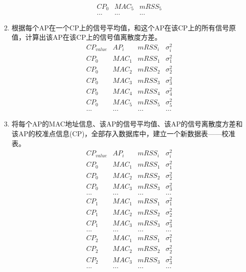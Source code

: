 \documentclass[UTF8, twocolumn ]{ctexart}
\begin{document}
\begin{enumerate}
\begin{displaymath}
\begin{array}{c|c|c}
      CP_{0} & MAC_{5} & mRSS_{5} \\
      ... & ... & ...
    \end{array}
  \end{displaymath}
\item 根据每个AP在一个CP上的信号平均值，和这个AP在该CP上的所有信号原值，计算出该AP在该CP上的信号值离散度方差。
  \begin{displaymath}
    \begin{array}{c|c|c|c}
      CP_{value} & AP_{i} & mRSS_{i} & \sigma^{2}_{i} \\ \hline
      CP_{0} & MAC_{1} & mRSS_{1} & \sigma^{2}_{1} \\
      CP_{0} & MAC_{2} & mRSS_{2} & \sigma^{2}_{2} \\
      CP_{0} & MAC_{3} & mRSS_{3} & \sigma^{2}_{3} \\
      CP_{0} & MAC_{4} & mRSS_{4} & \sigma^{2}_{4} \\
      CP_{0} & MAC_{5} & mRSS_{5} & \sigma^{2}_{5} \\
      ... & ... & ... & ...
    \end{array}
  \end{displaymath}
\item 将每个AP的MAC地址信息、该AP的信号平均值、该AP的信号离散度方差和该AP的校准点信息(CP)，全部存入数据库中，建立一个新数据表——校准表。
  \begin{displaymath}
    \begin{array}{c|c|c|c}
      CP_{value} & AP_{i} & mRSS_{i} & \sigma^{2}_{i} \\ \hline
      CP_{0} & MAC_{1} & mRSS_{1} & \sigma^{2}_{1} \\
      CP_{0} & MAC_{2} & mRSS_{2} & \sigma^{2}_{2} \\
      CP_{0} & MAC_{3} & mRSS_{3} & \sigma^{2}_{3} \\
      ... & ... & ... & ... \\
      CP_{1} & MAC_{1} & mRSS_{1} & \sigma^{2}_{1} \\
      CP_{1} & MAC_{2} & mRSS_{2} & \sigma^{2}_{2} \\
      CP_{1} & MAC_{3} & mRSS_{3} & \sigma^{2}_{3} \\
      ... & ... & ... & ... \\
      CP_{2} & MAC_{1} & mRSS_{1} & \sigma^{2}_{1} \\
      CP_{2} & MAC_{2} & mRSS_{2} & \sigma^{2}_{2} \\
      CP_{2} & MAC_{3} & mRSS_{3} & \sigma^{2}_{3} \\
      ... & ... & ... & ...
    \end{array}
  \end{displaymath}
\end{enumerate}
\end{document}
